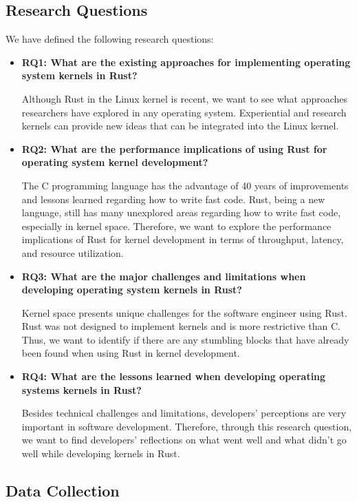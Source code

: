 \documentclass[sigconf]{acmart}
\begin{document}
\subsection{Research Questions}
\label{sec:researchQuestions}

We have defined the following research questions:

\begin{itemize}
    \item \textbf{RQ1: What are the existing approaches for implementing operating system kernels in Rust?}

    Although Rust in the Linux kernel is recent, we want to see what approaches researchers have explored in any operating system. Experiential and research kernels can provide new ideas that can be integrated into the Linux kernel.
    \item \textbf{RQ2: What are the performance implications of using Rust for operating system kernel development?}

    The C programming language has the advantage of 40 years of improvements and lessons learned regarding how to write fast code. Rust, being a new language, still has many unexplored areas regarding how to write fast code, especially in kernel space. Therefore, we want to explore the performance implications of Rust for kernel development in terms of throughput, latency, and resource utilization.
    \item \textbf{RQ3: What are the major challenges and limitations when developing operating system kernels in Rust?}

      Kernel space presents unique challenges for the software engineer using Rust. Rust was not designed to implement kernels and is more restrictive than C. Thus, we want to identify if there are any stumbling blocks that have already been found when using Rust in kernel development.
    \item \textbf{RQ4: What are the lessons learned when developing operating systems kernels in Rust?}

    Besides technical challenges and limitations, developers' perceptions are very important in software development. Therefore, through this research question, we want to find developers' reflections on what went well and what didn't go well while developing kernels in Rust.
\end{itemize}

\subsection{Data Collection}
\end{document}
